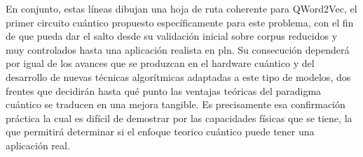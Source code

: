 En conjunto, estas líneas dibujan una hoja de ruta coherente para QWord2Vec, el primer circuito cuántico propuesto específicamente para este problema, con el fin de que pueda dar el salto desde su validación inicial sobre corpus reducidos y muy controlados hasta una aplicación realista en \gls{pln}. Su consecución dependerá por igual de los avances que se produzcan en el hardware cuántico y del desarrollo de nuevas técnicas algorítmicas adaptadas a este tipo de modelos, dos frentes que decidirán hasta qué punto las ventajas teóricas del paradigma cuántico se traducen en una mejora tangible. Es precisamente esa confirmación práctica la cual es difícil de demostrar por las capacidades físicas que se tiene, la que permitirá determinar si el enfoque teorico cuántico puede tener una aplicación real.
